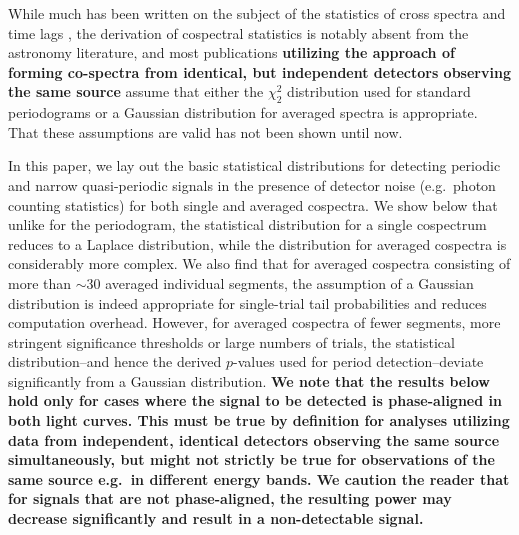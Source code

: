 \documentclass[12pt]{emulateapj}
\begin{document}
While much has been written on the subject of the statistics of cross spectra and time lags \citep[e.g.][]{epitropakis2016}, the derivation of cospectral statistics is notably absent from the astronomy literature, and most publications \textbf{utilizing the approach of forming co-spectra from identical, but independent detectors observing the same source} assume that either the $\chi^2_2$ distribution used for standard periodograms or a Gaussian distribution for averaged spectra is appropriate. That these assumptions are valid has not been shown until now. 

In this paper, we lay out the basic statistical distributions for detecting periodic and narrow quasi-periodic signals in the presence of detector noise (e.g.\ photon counting statistics) for both single and averaged cospectra. We show below that unlike for the periodogram, the statistical distribution for a single cospectrum reduces to a Laplace distribution, while the distribution for averaged cospectra is considerably more complex. We also find that for averaged cospectra consisting of more than $\sim$30 averaged individual segments, the assumption of a Gaussian distribution is indeed appropriate for single-trial tail probabilities and reduces computation overhead. However, for averaged cospectra of fewer segments, more stringent significance thresholds or large numbers of trials, the statistical distribution--and hence the derived $p$-values used for period detection--deviate significantly from a Gaussian distribution. \textbf{We note that the results below hold only for cases where the signal to be detected is phase-aligned in both light curves. This must be true by definition for analyses utilizing data from independent, identical detectors observing the same source simultaneously, but might not strictly be true for observations of the same source e.g.\ in different energy bands. We caution the reader that for signals that are not phase-aligned, the resulting power may decrease significantly and result in a non-detectable signal.}
\end{document}
